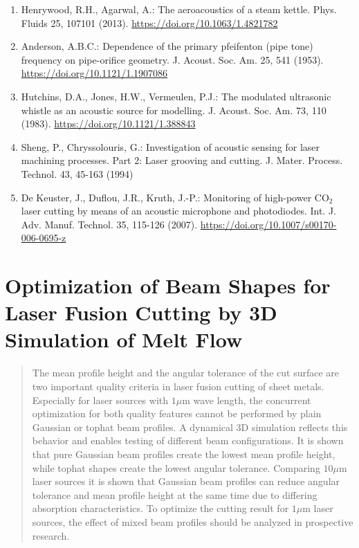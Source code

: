 \documentclass[10pt]{article}
\begin{document}
\begin{enumerate}
  \item Henrywood, R.H., Agarwal, A.: The aeroacoustics of a steam kettle. Phys. Fluids 25, 107101 (2013). \href{https://doi.org/10.1063/1.4821782}{https://doi.org/10.1063/1.4821782}

  \item Anderson, A.B.C.: Dependence of the primary pfeifenton (pipe tone) frequency on pipe-orifice geometry. J. Acoust. Soc. Am. 25, 541 (1953). \href{https://doi.org/10.1121/1.1907086}{https://doi.org/10.1121/1.1907086}

  \item Hutchins, D.A., Jones, H.W., Vermeulen, P.J.: The modulated ultrasonic whistle as an acoustic source for modelling. J. Acoust. Soc. Am. 73, 110 (1983). \href{https://doi.org/10.1121/1.388843}{https://doi.org/10.1121/1.388843}

  \item Sheng, P., Chryssolouris, G.: Investigation of acoustic sensing for laser machining processes. Part 2: Laser grooving and cutting. J. Mater. Process. Technol. 43, 45-163 (1994)

  \item De Keuster, J., Duflou, J.R., Kruth, J.-P.: Monitoring of high-power $\mathrm{CO}_{2}$ laser cutting by means of an acoustic microphone and photodiodes. Int. J. Adv. Manuf. Technol. 35, 115-126 (2007). \href{https://doi.org/10.1007/s00170-006-0695-z}{https://doi.org/10.1007/s00170-006-0695-z}

\end{enumerate}

\section*{Optimization of Beam Shapes for Laser Fusion Cutting by 3D Simulation of Melt Flow }


\begin{abstract}
The mean profile height and the angular tolerance of the cut surface are two important quality criteria in laser fusion cutting of sheet metals. Especially for laser sources with $1 \mu \mathrm{m}$ wave length, the concurrent optimization for both quality features cannot be performed by plain Gaussian or tophat beam profiles. A dynamical 3D simulation reflects this behavior and enables testing of different beam configurations. It is shown that pure Gaussian beam profiles create the lowest mean profile height, while tophat shapes create the lowest angular tolerance. Comparing $10 \mu \mathrm{m}$ laser sources it is shown that Gaussian beam profiles can reduce angular tolerance and mean profile height at the same time due to differing absorption characteristics. To optimize the cutting result for $1 \mu \mathrm{m}$ laser sources, the effect of mixed beam profiles should be analyzed in prospective research.
\end{abstract}
\end{document}
